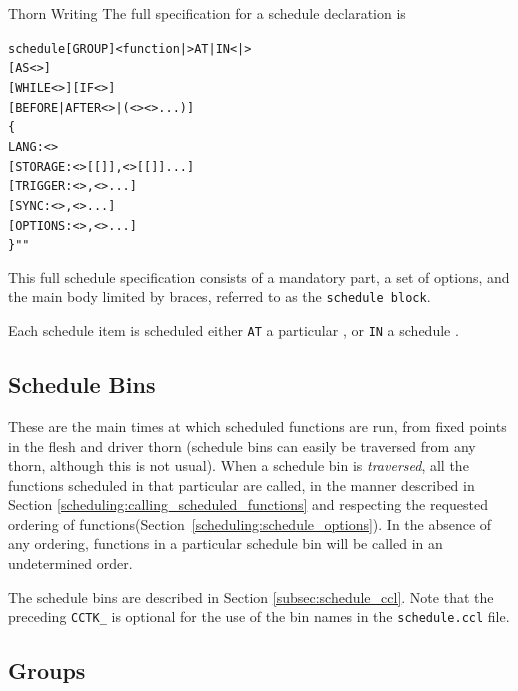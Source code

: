 \begin{cactuspart}{Thorn Writing}
The full specification for a schedule declaration is
\begin{alltt}schedule [GROUP] <function|> AT|IN <|>
         [AS <>]
         [WHILE <>] [IF <>]
         [BEFORE|AFTER <>|(<> <> ...)]
\{
  LANG: <>
  [STORAGE:       <>[[]],<>[[]]...]
  [TRIGGER:       <>,<>...]
  [SYNC:          <>,<>...]
  [OPTIONS:       <>,<>...]
\} ""
\end{alltt}

This full schedule specification consists of a mandatory part, a set
of options, and the main body limited by braces, referred to as the
\texttt{schedule block}.

Each schedule item is scheduled either \texttt{AT} a particular
, or \texttt{IN} a schedule .


\subsection{Schedule Bins}
\label{scheduling:schedule_bins}

These are the main times at which scheduled functions are run, from
fixed points in the flesh and driver thorn (schedule bins can easily
be traversed from any thorn, although this is not usual).  When a
schedule bin is \textit{traversed}, all the functions scheduled in that
particular are called, in the manner described in Section
\ref{scheduling:calling_scheduled_functions} and respecting the
requested ordering of functions(Section~\ref{scheduling:schedule_options}). In the absence of any ordering, functions in a particular schedule bin will be called in
an undetermined order.

The schedule bins are described in Section \ref{subsec:schedule_ccl}. Note that
the preceding \texttt{CCTK\_} is optional for the use of the bin names
in the \texttt{schedule.ccl} file.


\subsection{Groups}
\label{scheduling:groups}


\end{cactuspart}
